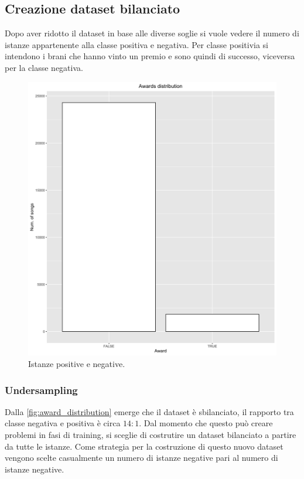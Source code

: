 \subsection{Creazione dataset bilanciato}
Dopo aver ridotto il dataset in base alle diverse soglie si vuole vedere il numero di istanze appartenente alla classe positiva e negativa. Per classe positivia si intendono i brani che hanno vinto un premio e sono quindi di successo, viceversa per la classe negativa.

\begin{figure}[H]
	\centering
	\includegraphics[width=14cm]{../images/awards_distribution.png}
	\caption{Istanze positive e negative.}
	\label{fig:award_distribution}
\end{figure}

\subsubsection{Undersampling}
Dalla \autoref{fig:award_distribution} emerge che il dataset è sbilanciato, il rapporto tra classe negativa e positiva è circa $14:1$. Dal momento che questo può creare problemi in fasi di training, si sceglie di costrutire un dataset bilanciato a partire da tutte le istanze. Come strategia per la costruzione di questo nuovo dataset vengono scelte casualmente un numero di istanze negative pari al numero di istanze negative.

